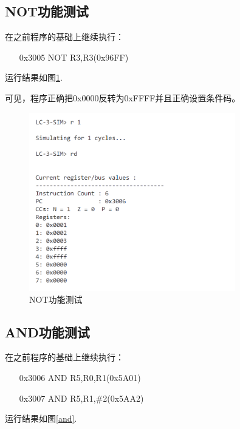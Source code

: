 \documentclass[UTF8]{ctexart}
\begin{document}
\subsection{NOT功能测试}
在之前程序的基础上继续执行：
\begin{enumerate}
    \item[0x3005] NOT R3,R3(0x96FF)
\end{enumerate}
运行结果如图\ref{not}.

可见，程序正确把0x0000反转为0xFFFF并且正确设置条件码。
\begin{figure}[htbp]
  \centering
  \includegraphics[width=0.8\textwidth]{not.png} %
  \caption{NOT功能测试}
  \label{not}
\end{figure}

\subsection{AND功能测试}
在之前程序的基础上继续执行：
\begin{enumerate}
    \item[0x3006] AND R5,R0,R1(0x5A01)
    \item[0x3007]AND R5,R1,\#2(0x5AA2)
\end{enumerate}
运行结果如图\ref{and}.
\end{document}

